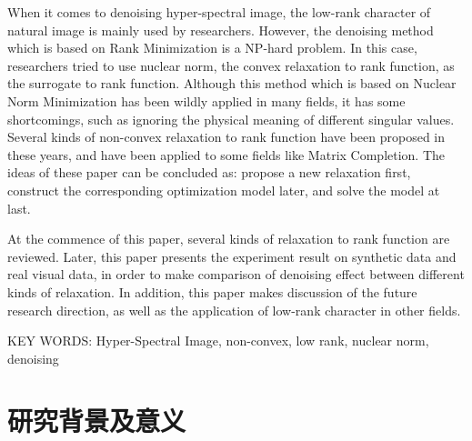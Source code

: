 \documentclass[12pt, a4paper]{article}
\begin{document}
\par When it comes to denoising hyper-spectral image, the low-rank character of natural image is mainly used by researchers. However, the denoising method which is based on Rank Minimization is a NP-hard problem. In this case, researchers tried to use nuclear norm, the convex relaxation to rank function, as the surrogate to rank function. Although this method which is based on Nuclear Norm Minimization has been wildly applied in many fields, it has some shortcomings, such as ignoring the physical meaning of different singular values. Several kinds of non-convex relaxation to rank function have been proposed in these years, and have been applied to some fields like Matrix Completion. The ideas of these paper can be concluded as: propose a new relaxation first, construct the corresponding optimization model later, and solve the model at last.
\par At the commence of this paper, several kinds of relaxation to rank function are reviewed. Later, this paper presents the experiment result on synthetic data and real visual data, in order to make comparison of denoising effect between different kinds of relaxation. In addition, this paper makes discussion of the future research direction, as well as the application of low-rank character in other fields.
\newline
\par KEY WORDS: Hyper-Spectral Image, non-convex, low rank, nuclear norm, denoising
\newpage
{{\tableofcontents}}
\newpage
{}
\pagestyle{fancy}
\lhead{}
\rhead{}
\section{研究背景及意义}
\end{document}
